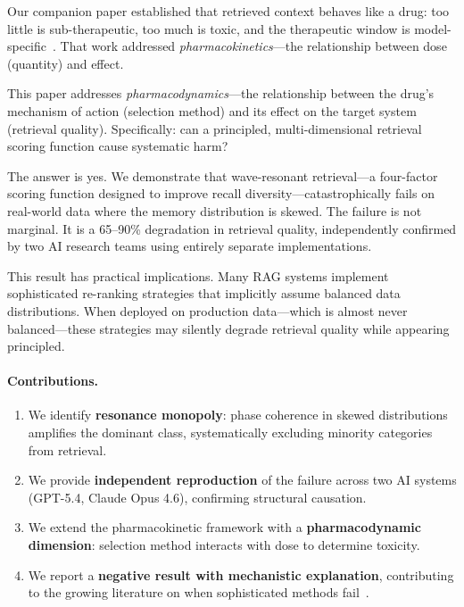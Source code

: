 \documentclass[11pt,a4paper]{article}
\begin{document}
Our companion paper established that retrieved context behaves like a drug: too little is sub-therapeutic, too much is toxic, and the therapeutic window is model-specific~\citep{jo2026pharmacokinetics}. That work addressed \emph{pharmacokinetics}---the relationship between dose (quantity) and effect.

This paper addresses \emph{pharmacodynamics}---the relationship between the drug's mechanism of action (selection method) and its effect on the target system (retrieval quality). Specifically: can a principled, multi-dimensional retrieval scoring function cause systematic harm?

The answer is yes. We demonstrate that wave-resonant retrieval---a four-factor scoring function designed to improve recall diversity---catastrophically fails on real-world data where the memory distribution is skewed. The failure is not marginal. It is a 65--90\% degradation in retrieval quality, independently confirmed by two AI research teams using entirely separate implementations.

This result has practical implications. Many RAG systems implement sophisticated re-ranking strategies that implicitly assume balanced data distributions. When deployed on production data---which is almost never balanced---these strategies may silently degrade retrieval quality while appearing principled.

\paragraph{Contributions.}
\begin{enumerate}[leftmargin=*, itemsep=2pt]
  \item We identify \textbf{resonance monopoly}: phase coherence in skewed distributions amplifies the dominant class, systematically excluding minority categories from retrieval.
  \item We provide \textbf{independent reproduction} of the failure across two AI systems (GPT-5.4, Claude Opus 4.6), confirming structural causation.
  \item We extend the pharmacokinetic framework with a \textbf{pharmacodynamic dimension}: selection method interacts with dose to determine toxicity.
  \item We report a \textbf{negative result with mechanistic explanation}, contributing to the growing literature on when sophisticated methods fail~\citep{lipton2018troubling}.
\end{enumerate}
\end{document}
